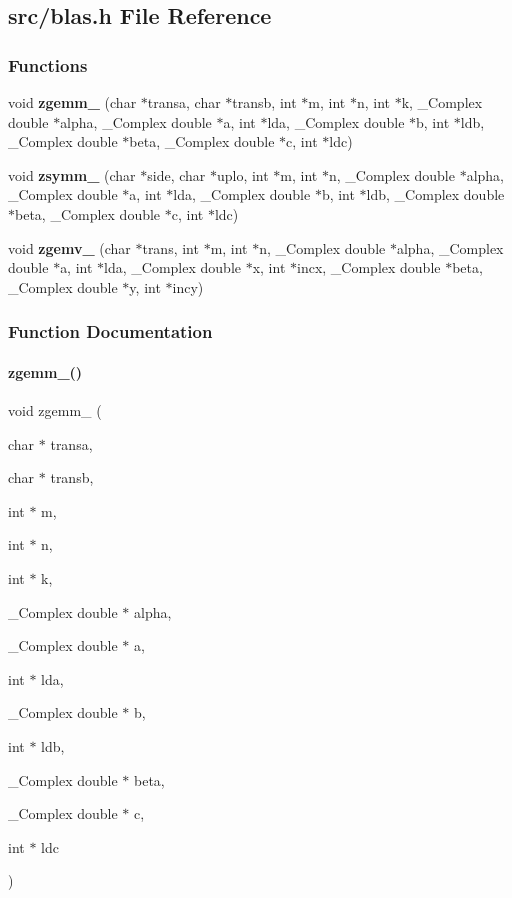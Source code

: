 \subsection{src/blas.h File Reference}
\label{blas_8h}
\subsubsection*{Functions}
\begin{DoxyCompactItemize}
\item 
void \textbf{ zgemm\+\_\+} (char $\ast$transa, char $\ast$transb, int $\ast$m, int $\ast$n, int $\ast$k, \+\_\+\+Complex double $\ast$alpha, \+\_\+\+Complex double $\ast$a, int $\ast$lda, \+\_\+\+Complex double $\ast$b, int $\ast$ldb, \+\_\+\+Complex double $\ast$beta, \+\_\+\+Complex double $\ast$c, int $\ast$ldc)
\item 
void \textbf{ zsymm\+\_\+} (char $\ast$side, char $\ast$uplo, int $\ast$m, int $\ast$n, \+\_\+\+Complex double $\ast$alpha, \+\_\+\+Complex double $\ast$a, int $\ast$lda, \+\_\+\+Complex double $\ast$b, int $\ast$ldb, \+\_\+\+Complex double $\ast$beta, \+\_\+\+Complex double $\ast$c, int $\ast$ldc)
\item 
void \textbf{ zgemv\+\_\+} (char $\ast$trans, int $\ast$m, int $\ast$n, \+\_\+\+Complex double $\ast$alpha, \+\_\+\+Complex double $\ast$a, int $\ast$lda, \+\_\+\+Complex double $\ast$x, int $\ast$incx, \+\_\+\+Complex double $\ast$beta, \+\_\+\+Complex double $\ast$y, int $\ast$incy)
\end{DoxyCompactItemize}


\subsubsection{Function Documentation}
\mbox{\label{blas_8h_afccb2308797975a14df9fa31c4e28b3f}} 
\paragraph{zgemm\_()}
{\footnotesize\ttfamily void zgemm\+\_\+ (\begin{DoxyParamCaption}\item[{char $\ast$}]{transa,  }\item[{char $\ast$}]{transb,  }\item[{int $\ast$}]{m,  }\item[{int $\ast$}]{n,  }\item[{int $\ast$}]{k,  }\item[{\+\_\+\+Complex double $\ast$}]{alpha,  }\item[{\+\_\+\+Complex double $\ast$}]{a,  }\item[{int $\ast$}]{lda,  }\item[{\+\_\+\+Complex double $\ast$}]{b,  }\item[{int $\ast$}]{ldb,  }\item[{\+\_\+\+Complex double $\ast$}]{beta,  }\item[{\+\_\+\+Complex double $\ast$}]{c,  }\item[{int $\ast$}]{ldc }\end{DoxyParamCaption})}

